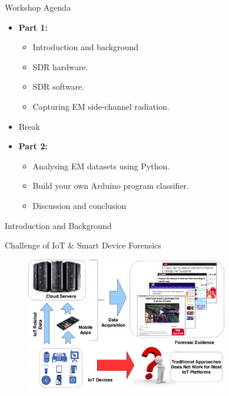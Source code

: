 \documentclass[handout]{beamer}
\begin{document}
\begin{frame}{Workshop Agenda}  

	\begin{itemize}
	\footnotesize
	\item \textbf{Part 1:}
		\begin{itemize}
		\footnotesize
		\item Introduction and background
		\item SDR hardware.
		\item SDR software.
		\item Capturing EM side-channel radiation.
		\end{itemize}
		\vspace{10pt}
	\item[] Break
		\vspace{10pt}
	\item \textbf{Part 2:}
		\begin{itemize}
		\footnotesize
		\item Analysing EM datasets using Python.
		\item Build your own Arduino program classifier.
		\item Discussion and conclusion
		\end{itemize}
	\end{itemize}

\end{frame}


\begin{frame}{}  

	\begin{block}{Introduction and Background}
	\end{block}

\end{frame}


\begin{frame}{Challenge of IoT \& Smart Device Forensics}  

	\begin{figure}
		\includegraphics[width=250pt]{figures/IoT-forensic-challenge-small.png}
	\end{figure}

\end{frame}
\end{document}
